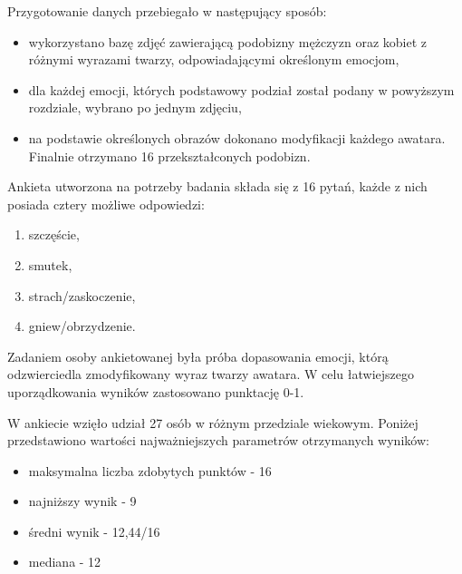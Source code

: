 Przygotowanie danych przebiegało w następujący sposób:
\begin{itemize}
    \item wykorzystano bazę zdjęć zawierającą podobizny mężczyzn oraz kobiet z różnymi wyrazami twarzy, odpowiadającymi określonym emocjom,
    \item dla każdej emocji, których podstawowy podział został podany w powyższym rozdziale, wybrano po jednym zdjęciu,
    \item na podstawie określonych obrazów dokonano modyfikacji każdego awatara. Finalnie otrzymano 16 przekształconych podobizn.
\end{itemize}


Ankieta utworzona na potrzeby badania składa się z  16 pytań, każde z nich posiada cztery możliwe odpowiedzi:

\begin{enumerate}
    \item szczęście,
    \item smutek,
    \item strach/zaskoczenie,
    \item gniew/obrzydzenie.
\end{enumerate}

Zadaniem osoby ankietowanej była próba dopasowania emocji, którą odzwierciedla zmodyfikowany wyraz twarzy awatara. W celu łatwiejszego uporządkowania wyników zastosowano punktację 0-1. 

W ankiecie wzięło udział 27 osób w różnym przedziale wiekowym. Poniżej przedstawiono wartości najważniejszych parametrów otrzymanych wyników:
\begin{itemize}
    \item maksymalna liczba zdobytych punktów - 16
    \item najniższy wynik - 9
    \item średni wynik - 12,44/16
    \item mediana - 12
\end{itemize}

